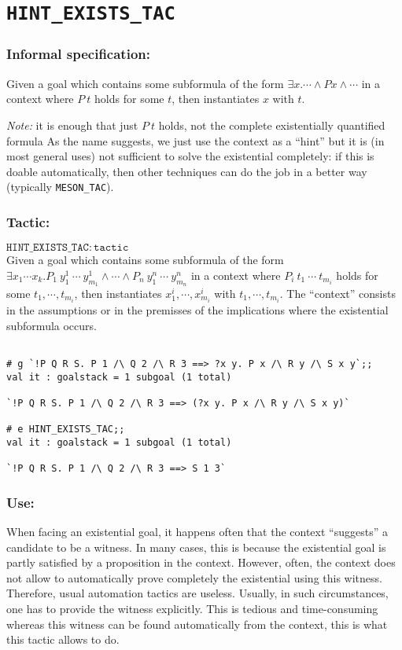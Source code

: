 \documentclass{llncs}
\newcommand*\MESON{\texttt{MESON\_TAC}\xspace}
\newcommand*\HINTTAC{\texttt{HINT\_EXISTS\_TAC}\xspace}
\begin{document}
  \section{\HINTTAC}

		\subsubsection{Informal specification:}
    Given a goal which contains some subformula of the form $\exists x. \cdots \wedge P x \wedge \cdots$
    in a context where $P\ t$ holds for some $t$, then instantiates $x$ with $t$.

    \emph{Note:} it is enough that just $P\ t$ holds, not the complete existentially quantified formula
    As the name suggests, we just use the context as a ``hint'' but it is (in most general uses)
    not sufficient to solve the existential completely: if this is doable automatically,
    then other techniques can do the job in a better way (typically \MESON).

		\subsubsection{Tactic:} 
		$\mathtt{\HINTTAC: tactic}$\\
    Given a goal which contains some subformula of the form
    $\exists x_1\cdots x_k. P_1\ y^1_1\ \cdots\ y^1_{m_1} \wedge \cdots \wedge P_n\ y^n_1\ \cdots\ y^n_{m_n}$
    in a context where $P_i\ t_1\ \cdots\ t_{m_i}$ holds for some $t_1,\cdots,t_{m_i}$,
    then instantiates $x^i_1,\cdots,x^i_{m_i}$ with $t_1,\cdots,t_{m_i}$.
    The ``context'' consists in the assumptions or in the premisses of the implications where
    the existential subformula occurs.

    \begin{example}
      \begin{verbatim}

# g `!P Q R S. P 1 /\ Q 2 /\ R 3 ==> ?x y. P x /\ R y /\ S x y`;;
val it : goalstack = 1 subgoal (1 total)

`!P Q R S. P 1 /\ Q 2 /\ R 3 ==> (?x y. P x /\ R y /\ S x y)`

# e HINT_EXISTS_TAC;;
val it : goalstack = 1 subgoal (1 total)

`!P Q R S. P 1 /\ Q 2 /\ R 3 ==> S 1 3` \end{verbatim}
    \end{example}

    \subsubsection{Use:} When facing an existential goal, it happens often that the context
    ``suggests'' a candidate to be a witness.
    In many cases, this is because the existential goal is partly satisfied by a proposition
    in the context.
    However, often, the context does not allow to automatically prove completely
    the existential using this witness. Therefore, usual automation tactics are useless.
    Usually, in such circumstances, one has to provide the witness explicitly.
    This is tedious and time-consuming whereas this witness can be found automatically from the context,
    this is what this tactic allows to do.
\end{document}
